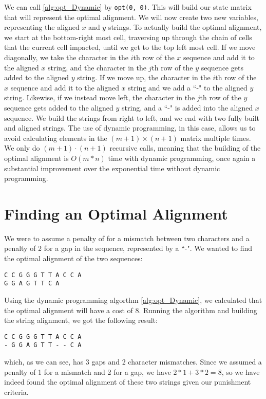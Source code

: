\documentclass{article}
\renewcommand{\_}{\ifincsname_\else\legacyunderscore\fi}
\begin{document}
        We can call \ref{alg:opt_Dynamic} by \texttt{opt(0, 0)}. This will build our state matrix that will represent the optimal alignment. We will now create two new variables, representing the aligned $x$ and $y$ strings. To actually build the optimal alignment, we start at the bottom-right most cell, traversing up through the chain of cells that the current cell impacted, until we get to the top left most cell. If we move diagonally, we take the character in the $i$th row of the $x$ sequence and add it to the aligned $x$ string, and the character in the $j$th row of the $y$ sequence gets added to the aligned $y$ string. If we move up, the character in the $i$th row of the $x$ sequence and add it to the aligned $x$ string and we add a ``-" to the aligned $y$ string. Likewise, if we instead move left, the character in the $j$th row of the $y$ sequence gets added to the aligned $y$ string, and a ``-" is added into the aligned $x$ sequence. We build the strings from right to left, and we end with two fully built and aligned strings. The use of dynamic programming, in this case, allows us to avoid calculating elements in the $(m+1)\times(n+1)$ matrix multiple times. We only do $(m+1)\cdot(n+1)$ recursive calls, meaning that the building of the optimal alignment is $O(m*n)$ time with dynamic programming, once again a substantial improvement over the exponential time without dynamic programming. 
    \section*{Finding an Optimal Alignment}
We were to assume a penalty of  for a mismatch between two characters and a penalty of 2 for a gap in the sequence, represented by a ``-". We wanted to find the optimal alignment of the two sequences: 
\begin{center}
        \texttt{C C G G G T T A C C A} \\
        \texttt{G G A G T T C A}
\end{center}
Using the dynamic programming algorthm \ref{alg:opt_Dynamic}, we calculated that the optimal alignment will have a cost of 8. Running the algorithm and building the string alignment, we got the following result:
\begin{center}
        \texttt{C C G G G T T A C C A} \\
        \texttt{- G G A G T T - - C A}
\end{center}
which, as we can see, has 3 gaps and 2 character mismatches. Since we assumed a penalty of 1 for a mismatch and 2 for a gap, we have $2*1 + 3*2 = 8$, so we have indeed found the optimal alignment of these two strings given our punishment criteria. 
\pagebreak
\end{document}
